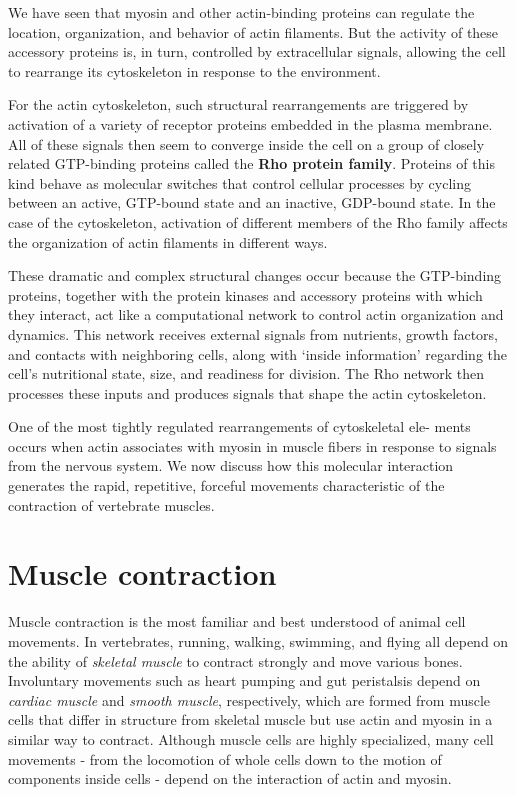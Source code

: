 We have seen that myosin and other actin-binding proteins can regulate
the location, organization, and behavior of actin filaments. But the
activity of these accessory proteins is, in turn, controlled by extracellular
signals, allowing the cell to rearrange its cytoskeleton in response to the
environment.

For the actin cytoskeleton, such structural rearrangements are triggered
by activation of a variety of receptor proteins embedded in the plasma
membrane. All of these signals then seem to converge inside the cell on
a group of closely related GTP-binding proteins called the \textbf{Rho protein
family}. Proteins of this kind behave as molecular switches that control
cellular processes by cycling between an active, GTP-bound state and an
inactive, GDP-bound state. In the case of the cytoskeleton, activation of different members of the Rho
family affects the organization of actin filaments in different ways.

These dramatic and complex structural changes occur because the GTP-binding
proteins, together with the protein kinases and accessory proteins
with which they interact, act like a computational network to control
actin organization and dynamics. This network receives external signals
from nutrients, growth factors, and contacts with neighboring cells,
along with ‘inside information’ regarding the cell’s nutritional state, size,
and readiness for division. The Rho network then processes these inputs
and produces signals that shape the actin cytoskeleton.

One of the most tightly regulated rearrangements of cytoskeletal ele-
ments occurs when actin associates with myosin in muscle fibers in
response to signals from the nervous system. We now discuss how this
molecular interaction generates the rapid, repetitive, forceful movements
characteristic of the contraction of vertebrate muscles.

\section{Muscle contraction}

Muscle contraction is the most familiar and best understood of animal
cell movements. In vertebrates, running, walking, swimming, and flying
all depend on the ability of \textit{skeletal muscle} to contract strongly and move
various bones. Involuntary movements such as heart pumping and gut
peristalsis depend on \textit{cardiac muscle} and \textit{smooth muscle}, respectively,
which are formed from muscle cells that differ in structure from skeletal
muscle but use actin and myosin in a similar way to contract. Although
muscle cells are highly specialized, many cell movements - from the
locomotion of whole cells down to the motion of components inside
cells - depend on the interaction of actin and myosin.

